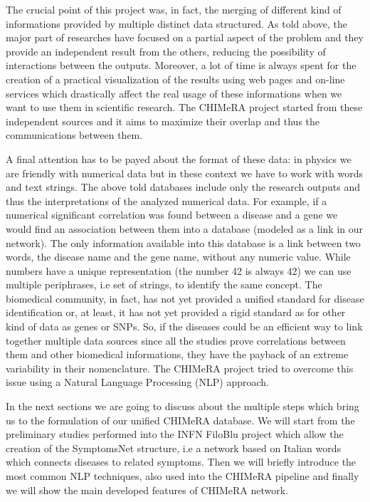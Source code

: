 \documentclass{standalone}
\begin{document}
The crucial point of this project was, in fact, the merging of different kind of informations provided by multiple distinct data structured.
As told above, the major part of researches have focused on a partial aspect of the problem and they provide an independent result from the others, reducing the possibility of interactions between the outputs.
Moreover, a lot of time is always spent for the creation of a practical visualization of the results using web pages and on-line services which drastically affect the real usage of these informations when we want to use them in scientific research.
The \textsf{CHIMeRA} project started from these independent sources and it aims to maximize their overlap and thus the communications between them.

A final attention has to be payed about the format of these data: in physics we are friendly with numerical data but in these context we have to work with words and text strings.
The above told databases include only the research outputs and thus the interpretations of the analyzed numerical data.
For example, if a numerical significant correlation was found between a disease and a gene we would find an association between them into a database (modeled as a link in our network).
The only information available into this database is a link between two words, the disease name and the gene name, without any numeric value.
While numbers have a unique representation (the number 42 is always 42) we can use multiple periphrases, i.e set of strings, to identify the same concept.
The biomedical community, in fact, has not yet provided a unified standard for disease identification or, at least, it has not yet provided a rigid standard as for other kind of data as genes or SNPs.
So, if the diseases could be an efficient way to link together multiple data sources since all the studies prove correlations between them and other biomedical informations, they have the payback of an extreme variability in their nomenclature.
The \textsf{CHIMeRA} project tried to overcome this issue using a Natural Language Processing (NLP) approach.

In the next sections we are going to discuss about the multiple steps which bring us to the formulation of our unified \textsf{CHIMeRA} database.
We will start from the preliminary studies performed into the INFN FiloBlu project which allow the creation of the \textsf{SymptomsNet} structure, i.e a  network based on Italian words which connects diseases to related symptoms.
Then we will briefly introduce the most common NLP techniques, also used into the \textsf{CHIMeRA} pipeline and finally we will show the main developed features of \textsf{CHIMeRA} network.

\end{document}
